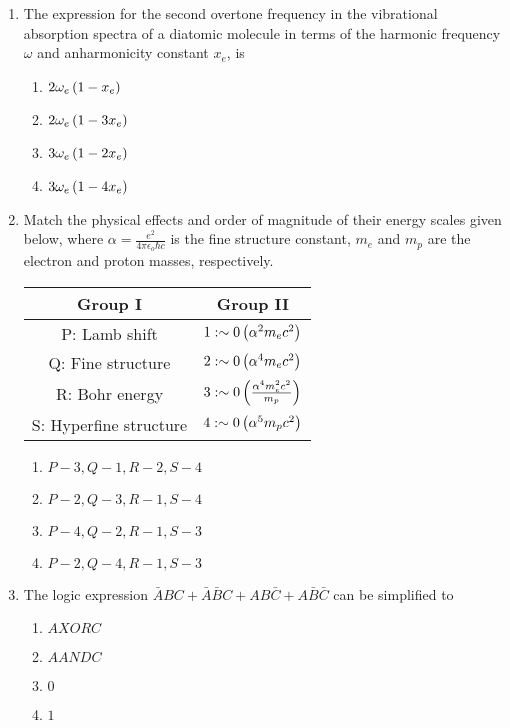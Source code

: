 \documentclass[journal,12pt,twocolumn]{IEEEtran}
\theoremstyle{remark}
\begin{document}
\begin{enumerate}[start=1]
\item The expression for the second overtone frequency in the vibrational absorption spectra of a diatomic molecule in terms of the harmonic frequency $\omega$ and anharmonicity constant $x_e$, is
\begin{enumerate}
    \item $2 \omega_e \left(1 - x_e\right)$
    \item $2 \omega_e \left(1 - 3x_e\right)$
    \item $3 \omega_e \left(1 - 2x_e\right)$
    \item $3 \omega_e \left(1 - 4x_e\right)$
\end{enumerate}

\item Match the physical effects and order of magnitude of their energy scales given below, where $\alpha=\frac{e^2}{4\pi\epsilon_o\hbar c}$ is the fine structure constant, $m_e$ and $m_p$ are the electron and proton masses, respectively.

\begin{tabular}{|c|c|}
\hline
Group I & Group II \\ \hline
P: Lamb shift & $1: \sim 0 \left(\alpha^2 m_e c^2\right)$ \\ \hline
Q: Fine structure & $2: \sim 0 \left(\alpha^4 m_e c^2\right)$ \\ \hline
R: Bohr energy & $3: \sim 0 \left(\frac{\alpha^4 m_e^2 c^2}{ m_p}\right)$ \\ \hline
S: Hyperfine structure & $4: \sim 0 \left(\alpha^5 m_p c^2\right)$ \\ \hline
\end{tabular}

\begin{enumerate}
    \item $P-3, Q-1, R-2, S-4$
    \item $P-2, Q-3, R-1, S-4$
    \item $P-4, Q-2, R-1, S-3$
    \item $P-2, Q-4, R-1, S-3$
\end{enumerate}

\item The logic expression $\bar{A}BC + \bar{A}\bar{B}C + AB\bar{C} + A\bar{B}\bar{C}$ can be simplified to
\begin{enumerate}
    \item $A XOR C$
    \item $A AND C$
    \item $0$
    \item $1$
\end{enumerate}


\end{enumerate}
\end{document}
